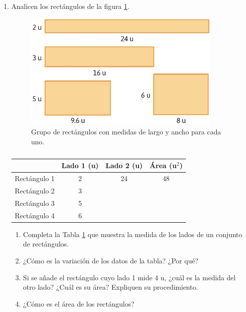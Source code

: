 \documentclass[11pt]{book}
\begin{document}
\begin{enumerate}
  \item Analicen los rectángulos de la figura \ref{fig:rectangulos}.
        \begin{figure}[H]
          \centering
          \includegraphics[width=0.9\textwidth]{ejem10.2}
          \caption{Grupo de rect\'angulos con medidas de largo y ancho para cada uno.}
          \label{fig:rectangulos}
        \end{figure}

        \begin{table}[!h]
          \centering
          \begin{tabular}{|l|c|c|c|}
            \hline
                         & Lado 1 (u) & Lado 2 (u) & Área (u$^2$) \\
            \hline
            Rectángulo 1 & 2          & 24         & 48           \\
            Rectángulo 2 & 3          &            &              \\
            Rectángulo 3 & 5          &            &              \\
            Rectángulo 4 & 6          &            &              \\
            \hline
          \end{tabular}
          \caption{}
          \label{tab:rectangulos}
        \end{table}
        \begin{enumerate}
          \item Completa la Tabla \ref{tab:rectangulos} que muestra la medida de los lados de un conjunto de rect\'angulos.
          \item ¿Cómo es la variación de los datos de la tabla? ¿Por qué?
          \item Si se añade el rectángulo cuyo lado 1 mide 4 u, ¿cuál es la medida del otro lado? ¿Cuál es su área? Expliquen su procedimiento.
          \item ¿Cómo es el área de los rectángulos?
        \end{enumerate}
\end{enumerate}
\end{document}
